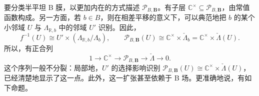 要分类半平坦 B 膜，以更加内在的方式描述 $\mathcal P_{B,\mathbf B}$。有子层 $\mathbb C^\times\subseteq\mathcal P_{B,\mathbf B}$，由常值函数构成。另一方面，若 $b\in B$，则在相差平移的意义下，可以典范地把 $b$ 的某个小邻域 $U$ 与 $\Lambda_{\mathbb R,b}$ 中的邻域 $U'$ 识别。因此，
\[
f^{-1}(U)\cong U'\times(\Lambda_{\mathbb R,b}/\Lambda_b),
\qquad
\mathcal P_{B,\mathbf B}(U)
\cong\mathbb C^\times\times\check\Lambda_b
=\mathbb C^\times\times\check\Lambda(U).
\]
所以，有正合列
\[
1\longrightarrow\mathbb C^\times\longrightarrow\mathcal P_{B,\mathbf B}
\longrightarrow\check\Lambda\longrightarrow0.
\]
这个序列一般不分裂：局部地，$U'$ 的选择影响识别 $\mathcal P_{B,\mathbf B}(U)\cong\mathbb C^\times\times\check\Lambda(U)$，已经清楚地显示了这一点。此外，这一扩张甚至依赖于 B 场。更准确地说，有如下命题。

